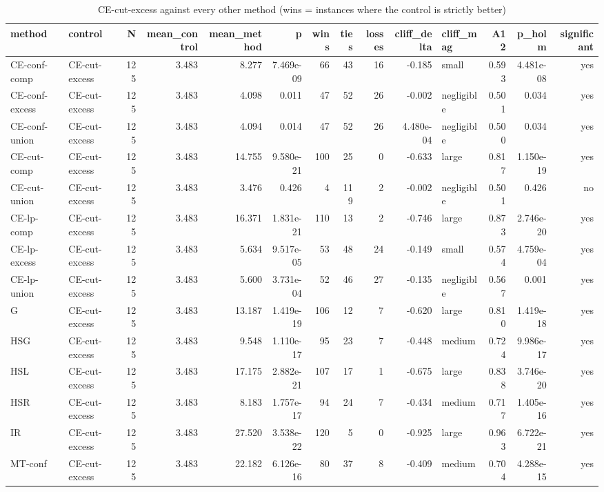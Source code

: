 \begin{table}[htbp]
\centering
\small
\caption{CE-cut-excess against every other method (wins = instances where the control is strictly better)}
\label{tab:E2_head_to_head_vs_CE-cut-excess}
\begin{tabular}{llrrrrrrrrlrrr}
\toprule
method & control & N & mean\_control & mean\_method & p & wins & ties & losses & cliff\_delta & cliff\_mag & A12 & p\_holm & significant \\
\midrule
CE-conf-comp & CE-cut-excess & 125 & 3.483 & 8.277 & 7.469e-09 & 66 & 43 & 16 & -0.185 & small & 0.593 & 4.481e-08 & yes \\
CE-conf-excess & CE-cut-excess & 125 & 3.483 & 4.098 & 0.011 & 47 & 52 & 26 & -0.002 & negligible & 0.501 & 0.034 & yes \\
CE-conf-union & CE-cut-excess & 125 & 3.483 & 4.094 & 0.014 & 47 & 52 & 26 & 4.480e-04 & negligible & 0.500 & 0.034 & yes \\
CE-cut-comp & CE-cut-excess & 125 & 3.483 & 14.755 & 9.580e-21 & 100 & 25 & 0 & -0.633 & large & 0.817 & 1.150e-19 & yes \\
CE-cut-union & CE-cut-excess & 125 & 3.483 & 3.476 & 0.426 & 4 & 119 & 2 & -0.002 & negligible & 0.501 & 0.426 & no \\
CE-lp-comp & CE-cut-excess & 125 & 3.483 & 16.371 & 1.831e-21 & 110 & 13 & 2 & -0.746 & large & 0.873 & 2.746e-20 & yes \\
CE-lp-excess & CE-cut-excess & 125 & 3.483 & 5.634 & 9.517e-05 & 53 & 48 & 24 & -0.149 & small & 0.574 & 4.759e-04 & yes \\
CE-lp-union & CE-cut-excess & 125 & 3.483 & 5.600 & 3.731e-04 & 52 & 46 & 27 & -0.135 & negligible & 0.567 & 0.001 & yes \\
G & CE-cut-excess & 125 & 3.483 & 13.187 & 1.419e-19 & 106 & 12 & 7 & -0.620 & large & 0.810 & 1.419e-18 & yes \\
HSG & CE-cut-excess & 125 & 3.483 & 9.548 & 1.110e-17 & 95 & 23 & 7 & -0.448 & medium & 0.724 & 9.986e-17 & yes \\
HSL & CE-cut-excess & 125 & 3.483 & 17.175 & 2.882e-21 & 107 & 17 & 1 & -0.675 & large & 0.838 & 3.746e-20 & yes \\
HSR & CE-cut-excess & 125 & 3.483 & 8.183 & 1.757e-17 & 94 & 24 & 7 & -0.434 & medium & 0.717 & 1.405e-16 & yes \\
IR & CE-cut-excess & 125 & 3.483 & 27.520 & 3.538e-22 & 120 & 5 & 0 & -0.925 & large & 0.963 & 6.722e-21 & yes \\
MT-conf & CE-cut-excess & 125 & 3.483 & 22.182 & 6.126e-16 & 80 & 37 & 8 & -0.409 & medium & 0.704 & 4.288e-15 & yes \\

\end{tabular}
\end{table}
